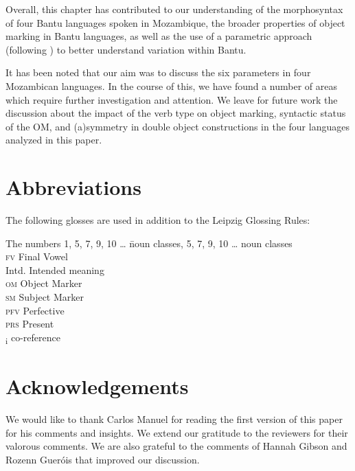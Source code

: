 \documentclass[output=paper]{langscibook}
\begin{document}
Overall, this chapter has contributed to our understanding of the morphosyntax of four Bantu languages spoken in Mozambique, the broader properties of object marking in Bantu languages, as well as the use of a parametric approach (following \citet{MartenKula2012}) to better understand variation within Bantu.

It has been noted that our aim was to discuss the \citet{MartenKula2012} six parameters in four Mozambican languages. In the course of this, we have found a number of areas which require further investigation and attention. We leave for future work the discussion about the impact of the verb type on object marking, syntactic status of the OM, and (a)symmetry in double object constructions in the four languages analyzed in this paper. 

\section*{Abbreviations}
The following glosses are used in addition to the Leipzig Glossing Rules: 
\begin{tabbing}
The numbers 1, 5, 7, 9, 10 \ldots\hspace{1ex} \= noun classes, 5, 7, 9, 10 \ldots \> noun classes\\
\textsc{fv} \> Final Vowel\\
Intd. \> Intended meaning\\
\textsc{om} \> Object Marker\\
\textsc{sm} \> Subject Marker\\
\textsc{pfv} \> Perfective\\
\textsc{prs} \> Present\\
{\textsubscript{i}} \> co-reference\\

\end{tabbing}

\section*{Acknowledgements}
We would like to thank Carlos Manuel for reading the first version of this paper for his comments and insights. We extend our gratitude to the reviewers for their valorous comments. We are also grateful to the comments of Hannah Gibson and Rozenn Gueróis that improved our discussion.

\printbibliography[heading=subbibliography,notkeyword=this]
\end{document}
